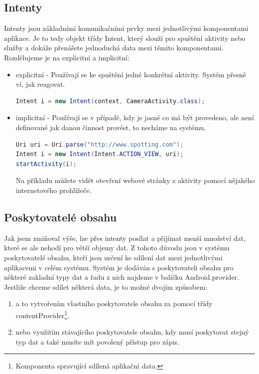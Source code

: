 \documentclass[12pt]{article}
\begin{document}
\subsection{Intenty}
Intenty jsou základními komunikačními prvky mezi jednotlivými komponentami aplikace. Je to tedy objekt třídy Intent, který slouží pro spuštění aktivity nebo služby a dokáže přenášete jednoduchá data mezi těmito komponentami. Rozdělujeme je na explicitní a implicitní:
\newpage
\begin{itemize}
\item explicitní - Používají se ke spuštění jedné konkrétní aktivity. Systém přesně ví, jak reagovat.

\begin{lstlisting}[language=Java,
title=Ukázka explicitního intentu.,
basicstyle=\ttfamily\small\color{black},
commentstyle=\itshape,
keywordstyle=\color{Blue},
showstringspaces=false,
frame=lines,
backgroundcolor=\color{lightGrey}
]
Intent i = new Intent(context, CameraActivity.class);
\end{lstlisting}
\item implicitní - Používají se v případě, kdy je jasné co má být provedeno, ale není definované jak danou činnost provést, to necháme na systému.
\begin{lstlisting}[language=Java,
title=Ukázka implicitního intentu.,
basicstyle=\ttfamily\small\color{black},
commentstyle=\itshape,
keywordstyle=\color{Blue},
showstringspaces=false,
frame=lines,
backgroundcolor=\color{lightGrey}
]
Uri uri = Uri.parse("http://www.spotting.com");
Intent i = new Intent(Intent.ACTION_VIEW, uri);
startActivity(i);
\end{lstlisting}
Na příkladu můžete vidět otevření webové stránky z aktivity pomocí nějakého internetového prohlížeče.
\end{itemize}
\subsection{Poskytovatelé obsahu}
Jak jsem zmiňoval výše, lze přes intenty posílat a přijímat menší množství dat, které se ale nehodí pro větší objemy dat. Z tohoto důvodu jsou v systému poskytovatelé obsahu, kteří jsou určení ke sdílení dat mezi jednotlivými aplikacemi v celém systému. Systém je dodáván s poskytovateli obsahu pro některé zakladní typy dat a řadu z nich najdeme v balíčku Android.provider. Jestliže chceme sdílet některá data, je to možné dvojím způsobem:
\begin{enumerate}
\item a to vytvořením vlastního poskytovatele obsahu za pomocí třídy contentProvider\footnote[8]{Komponenta spravující sdílená aplikační data.}.
\item nebo využitím stávajícího poskytovatele obsahu, kdy musí poskytovat stejný typ dat a také musíte mít povolený přístup pro zápis.
\end{enumerate}
\end{document}
